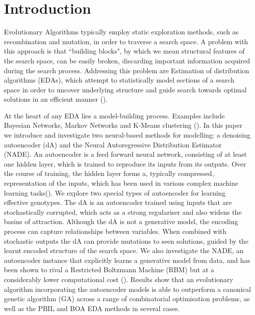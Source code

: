 \documentclass[twoside]{article}
\begin{document}
\section{Introduction}
Evolutionary Algorithms typically employ static exploration methods, such as recombination and mutation, in order to traverse a search space. A problem with this approach is that ``building blocks", by which we mean structural features of the search space, can be easily broken, discarding important information acquired during the search process. Addressing this problem are Estimation of distribution algorithms (EDAs), which attempt to statistically model sections of a search space in order to uncover underlying structure and guide search towards optimal solutions in an efficient manner (\cite{pelikan2006scalable}).

At the heart of any EDA lies a model-building process. Examples include Bayesian Networks, Markov Networks and K-Means clustering (\cite{pelikan2002survey}). In this paper we introduce and investigate two neural-based methods for modelling: a denoising autoencoder (dA) and the Neural Autoregressive Distribution Estimator (NADE). An autoencoder is a feed forward neural network, consisting of at least one hidden layer, which is trained to reproduce its inputs from its outputs. Over the course of training, the hidden layer forms a, typically compressed, representation of the inputs, which has been used in various complex machine learning tasks(\cite{hinton2006reducing}). We explore two special types of autoencoder for learning effective genotypes. The dA is an autoencoder trained using inputs that are stochastically corrupted, which acts as a strong regulariser and also widens the basins of attraction. Although the dA is not a generative model, the encoding process can capture relationships between variables. When combined with stochastic outputs the dA can provide mutations to seen solutions, guided by the learnt encoded structure of the search space. %
We also investigate the NADE, an autoencoder instance that explicitly learns a generative model from data, and has been shown to rival a Restricted Boltzmann Machine (RBM) but at a considerably lower computational cost (\cite{larochelle2011neural}). Results show that an evolutionary algorithm incorporating the autoencoder models is able to outperform a canonical genetic algorithm (GA) across a range of combinatorial optimisation problems, as well as the PBIL and BOA EDA methods in several cases.
\end{document}
